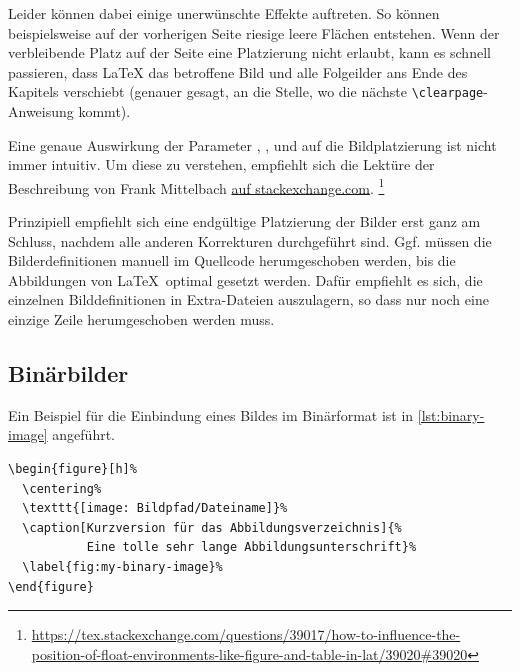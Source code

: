 Leider können dabei einige unerwünschte Effekte auftreten.
So können beispielsweise auf der vorherigen Seite riesige leere Flächen entstehen.
Wenn der verbleibende Platz auf der Seite eine Platzierung nicht erlaubt,
kann es schnell passieren, dass \LaTeX{} das betroffene Bild 
und alle Folgeilder ans Ende des Kapitels verschiebt
(genauer gesagt, an die Stelle, wo die nächste \lstinline|\clearpage|-Anweisung kommt).

Eine genaue Auswirkung der Parameter
, ,  und 
auf die Bildplatzierung ist nicht immer intuitiv.
Um diese zu verstehen, empfiehlt sich die Lektüre der Beschreibung
von Frank Mittelbach
\href{https://tex.stackexchange.com/questions/39017/how-to-influence-the-position-of-float-environments-like-figure-and-table-in-lat/39020#39020}{auf stackexchange.com}.%
\footnote{\url{https://tex.stackexchange.com/questions/39017/how-to-influence-the-position-of-float-environments-like-figure-and-table-in-lat/39020#39020}}

Prinzipiell empfiehlt sich eine endgültige Platzierung der Bilder erst ganz am Schluss,
nachdem alle anderen Korrekturen durchgeführt sind.
Ggf. müssen die Bilderdefinitionen manuell im Quellcode herumgeschoben werden,
bis die Abbildungen von \LaTeX\ optimal gesetzt werden.
Dafür empfiehlt es sich, die einzelnen Bilddefinitionen in Extra-Dateien auszulagern,
so dass nur noch eine einzige Zeile herumgeschoben werden muss.

\subsection[Binärbilder]{Binärbilder}%
\label{sec:Binaerbilder}
%
Ein Beispiel für die Einbindung eines Bildes im Binärformat ist in \cref{lst:binary-image} angeführt.

\begin{lstlisting}[float={htbp},caption={Einbindung einer Binärgrafik in LaTeX},label={lst:binary-image}]
\begin{figure}[h]%
  \centering%
  \texttt{[image: Bildpfad/Dateiname]}%
  \caption[Kurzversion für das Abbildungsverzeichnis]{%
           Eine tolle sehr lange Abbildungsunterschrift}%
  \label{fig:my-binary-image}%
\end{figure}
\end{lstlisting}

